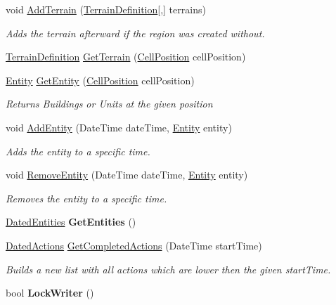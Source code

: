\begin{DoxyCompactItemize}
\item 
void \hyperlink{classCore_1_1Models_1_1Region_ad5e343aa96c3a1a28f5a98df87272cd9}{Add\-Terrain} (\hyperlink{classCore_1_1Models_1_1Definitions_1_1TerrainDefinition}{Terrain\-Definition}\mbox{[},\mbox{]} terrains)
\begin{DoxyCompactList}\small\item\em Adds the terrain afterward if the region was created without. \end{DoxyCompactList}\item 
\hyperlink{classCore_1_1Models_1_1Definitions_1_1TerrainDefinition}{Terrain\-Definition} \hyperlink{classCore_1_1Models_1_1Region_a1a49bf46e734963dc63aeb2cd2ce4063}{Get\-Terrain} (\hyperlink{classCore_1_1Models_1_1CellPosition}{Cell\-Position} cell\-Position)
\item 
\hyperlink{classCore_1_1Models_1_1Entity}{Entity} \hyperlink{classCore_1_1Models_1_1Region_aef86ef05f6bc2d535aca5d902e0c2731}{Get\-Entity} (\hyperlink{classCore_1_1Models_1_1CellPosition}{Cell\-Position} cell\-Position)
\begin{DoxyCompactList}\small\item\em Returns Buildings or Units at the given position \end{DoxyCompactList}\item 
void \hyperlink{classCore_1_1Models_1_1Region_ab696b3c1b6cc9d55b3c4eae768339ebd}{Add\-Entity} (Date\-Time date\-Time, \hyperlink{classCore_1_1Models_1_1Entity}{Entity} entity)
\begin{DoxyCompactList}\small\item\em Adds the entity to a specific time. \end{DoxyCompactList}\item 
void \hyperlink{classCore_1_1Models_1_1Region_a05d102bebab28be04e9184ed438b6cda}{Remove\-Entity} (Date\-Time date\-Time, \hyperlink{classCore_1_1Models_1_1Entity}{Entity} entity)
\begin{DoxyCompactList}\small\item\em Removes the entity to a specific time. \end{DoxyCompactList}\item 
\hypertarget{classCore_1_1Models_1_1Region_a4d5cf1050b208c1d06fcf344027dabf9}{\hyperlink{classCore_1_1Models_1_1Region_1_1DatedEntities}{Dated\-Entities} {\bfseries Get\-Entities} ()}\label{classCore_1_1Models_1_1Region_a4d5cf1050b208c1d06fcf344027dabf9}

\item 
\hyperlink{classCore_1_1Models_1_1Region_1_1DatedActions}{Dated\-Actions} \hyperlink{classCore_1_1Models_1_1Region_ab1e90f76e173a9a28396f806f274b697}{Get\-Completed\-Actions} (Date\-Time start\-Time)
\begin{DoxyCompactList}\small\item\em Builds a new list with all actions which are lower then the given start\-Time. \end{DoxyCompactList}\item 
\hypertarget{classCore_1_1Models_1_1Region_a44181d46f6b2541119734f74cd195365}{bool {\bfseries Lock\-Writer} ()}\label{classCore_1_1Models_1_1Region_a44181d46f6b2541119734f74cd195365}


\end{DoxyCompactItemize}
